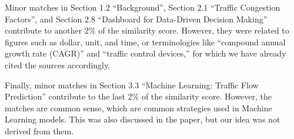 \documentclass[12pt]{article}
\begin{document}
Minor matches in Section 1.2 ``Background'', Section 2.1 ``Traffic Congestion Factors'', and Section 2.8 ``Dashboard for Data-Driven Decision Making'' contribute to another 2\% of the similarity score. However, they were related to figures such as dollar, unit, and time, or terminologies like ``compound annual growth rate (CAGR)'' and ``traffic control devices,'' for which we have already cited the sources accordingly.

Finally, minor matches in Section 3.3 ``Machine Learning: Traffic Flow Prediction'' contribute to the last 2\% of the similarity score. However, the matches are common sense, which are common strategies used in Machine Learning models. This was also discussed in the paper, but our idea was not derived from them.
\end{document}
